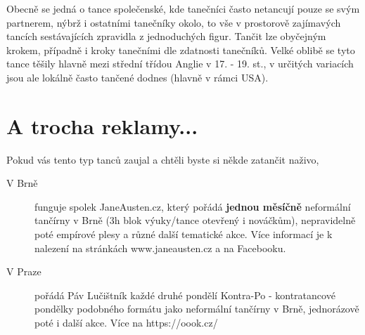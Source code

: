 {    Obecně se jedná o tance společenské, kde tanečníci často netancují pouze se svým partnerem, nýbrž i ostatními tanečníky okolo, to vše v prostorově zajímavých tancích sestávajících zpravidla z jednoduchých figur. Tančit lze obyčejným krokem, případně i kroky tanečními dle zdatnosti tanečníků. Velké oblibě se tyto tance těšily hlavně mezi střední třídou Anglie v 17. - 19. st., v určitých variacích jsou ale lokálně často tančené dodnes (hlavně v rámci USA).

    \section*{A trocha reklamy...}

    Pokud vás tento typ tanců zaujal a chtěli byste si někde zatančit naživo,
    \begin{description}
        \item[V Brně] funguje spolek JaneAusten.cz, který pořádá \textbf{jednou měsíčně} neformální tančírny v Brně (3h blok výuky/tance otevřený i nováčkům), nepravidelně poté empírové plesy a různé další tematické akce. Více informací je k nalezení na stránkách www.janeausten.cz a na Facebooku.
        \item[V Praze] pořádá Páv Lučištník každé druhé pondělí Kontra-Po - kontratancové pondělky podobného formátu jako neformální tančírny v Brně, jednorázově poté i další akce. Více na https://oook.cz/
    \end{description}

    \cleardoublepage   %
}
